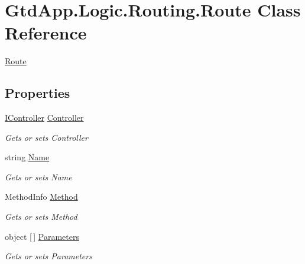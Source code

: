 \hypertarget{class_gtd_app_1_1_logic_1_1_routing_1_1_route}{}\section{Gtd\+App.\+Logic.\+Routing.\+Route Class Reference}
\label{class_gtd_app_1_1_logic_1_1_routing_1_1_route}


\mbox{\hyperlink{class_gtd_app_1_1_logic_1_1_routing_1_1_route}{Route}}  


\subsection*{Properties}
\begin{DoxyCompactItemize}
\item 
\mbox{\hyperlink{interface_gtd_app_1_1_logic_1_1_interfaces_1_1_i_controller}{I\+Controller}} \mbox{\hyperlink{class_gtd_app_1_1_logic_1_1_routing_1_1_route_a21619eba9519ac58f9fcce03ad234ff8}{Controller}}
\begin{DoxyCompactList}\small\item\em Gets or sets Controller \end{DoxyCompactList}\item 
string \mbox{\hyperlink{class_gtd_app_1_1_logic_1_1_routing_1_1_route_a1e22189466d432f64a2d4383eed36e52}{Name}}
\begin{DoxyCompactList}\small\item\em Gets or sets Name \end{DoxyCompactList}\item 
Method\+Info \mbox{\hyperlink{class_gtd_app_1_1_logic_1_1_routing_1_1_route_a2818da1f8810d9fd4f52598c5c2c8295}{Method}}
\begin{DoxyCompactList}\small\item\em Gets or sets Method \end{DoxyCompactList}\item 
object \mbox{[}$\,$\mbox{]} \mbox{\hyperlink{class_gtd_app_1_1_logic_1_1_routing_1_1_route_a4a18d7b4d6a44c38aece6553cbd50522}{Parameters}}
\begin{DoxyCompactList}\small\item\em Gets or sets Parameters \end{DoxyCompactList}\end{DoxyCompactItemize}


